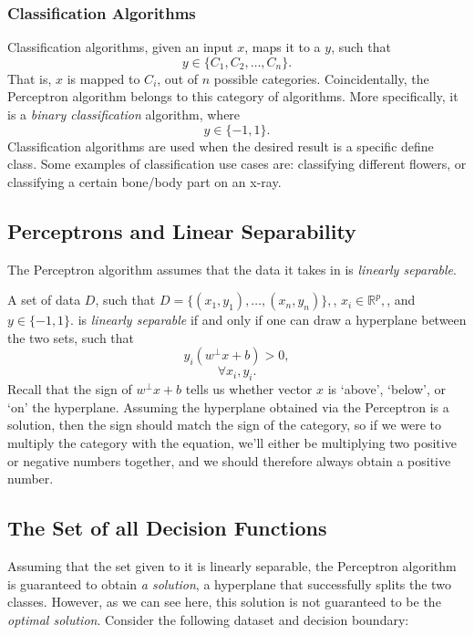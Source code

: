 \subsubsection{Classification Algorithms}
Classification algorithms, given an input $x$, maps it to a $y$, such that
\[
    y \in \{C_1, C_2, \dots, C_n\}.
\]
That is, $x$ is mapped to $C_i$, out of $n$ possible categories.
Coincidentally, the Perceptron algorithm belongs to this category of algorithms. More specifically, it is a \textit{binary classification} algorithm, where 
\[
    y \in \{-1, 1\}.
\]
Classification algorithms are used when the desired result is a specific define class. Some examples of classification use cases are: classifying different flowers, or classifying a certain bone/body part on an x-ray.

\subsection{Perceptrons and Linear Separability}
The Perceptron algorithm assumes that the data it takes in is \textit{linearly separable}.

A set of data $D$, such that
$
    D = \{(x_1,y_1), \dots,(x_n, y_n)\},
$, $
    x_i \in \mathbb{R}^p,
$, and $
    y \in \{-1, 1\}.
$ is \textit{linearly separable} if and only if one can draw a hyperplane between the two sets, such that
\[
    y_i(w^\perp x +b) > 0,
\] \[
    \forall x_i, y_i.
\]
Recall that the sign of $w^\perp x+b$ tells us whether vector $x$ is `above', `below', or `on' the hyperplane. Assuming the hyperplane obtained via the Perceptron is a solution, then the sign should match the sign of the category, so if we were to multiply the category with the equation, we'll either be multiplying two positive or negative numbers together, and we should therefore always obtain a positive number.

\subsection{The Set of all Decision Functions}
Assuming that the set given to it is linearly separable, the Perceptron algorithm is guaranteed to obtain \textit{a solution}, a hyperplane that successfully splits the two classes. However, as we can see here, this solution is not guaranteed to be the \textit{optimal solution}. Consider the following dataset and decision boundary:


